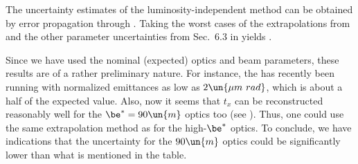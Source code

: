



The uncertainty estimates of the luminosity-independent method can be obtained by error propagation through . Taking the worst cases of the extrapolations from  and the other parameter uncertainties from Sec.~6.3 in  yields .


Since we have used the nominal (expected) optics and beam parameters, these results are of a rather preliminary nature. For instance, the  has recently been running with normalized emittances as low as $2 \un{\mu m\ rad}$, which is about a half of the expected value. Also, now it seems that $t_x$ can be reconstructed reasonably well for the $\be^* = 90\un{m}$ optics too (see ). Thus, one could use the same extrapolation method as for the high-$\be^*$ optics. To conclude, we have indications that the uncertainty for the $90\un{m}$ optics could be significantly lower than what is mentioned in the table.
